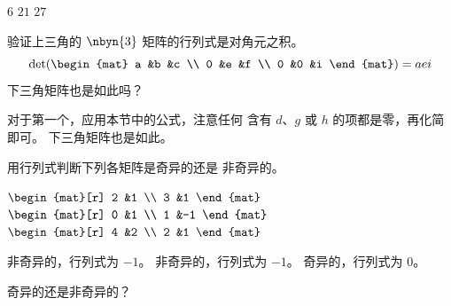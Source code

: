\begin{exercises}
    \begin{answer}
      \begin{exparts*}
        \partsitem \( 6 \)
        \partsitem \( 21 \)
        \partsitem \( 27 \)
      \end{exparts*}  
    \end{answer}
  \recommended \item  
    验证上三角的
    $\nbyn{3}$ 矩阵的行列式是对角元之积。
    \begin{equation*}
       \det(
       \begin{mat}
           a    &b   &c    \\
           0    &e   &f    \\
           0    &0   &i
       \end{mat}
       )
       =aei
    \end{equation*}
    下三角矩阵也是如此吗？
    \begin{answer}
      对于第一个，应用本节中的公式，注意任何
      含有 \( d \)、\( g \) 或 \( h \) 的项都是零，再化简即可。
      下三角矩阵也是如此。  
    \end{answer}
  \recommended \item 
     用行列式判断下列各矩阵是奇异的还是
     非奇异的。
     \begin{exparts*}
       \partsitem \(
            \begin{mat}[r]
                2    &1   \\
                3    &1
            \end{mat}    \)
       \partsitem \(
            \begin{mat}[r]
                0    &1   \\
                1    &-1
            \end{mat}    \)
       \partsitem \(
            \begin{mat}[r]
                4    &2   \\
                2    &1
            \end{mat}    \)
     \end{exparts*}
     \begin{answer}
       \begin{exparts}
         \partsitem 非奇异的，行列式为 \( -1 \)。
         \partsitem 非奇异的，行列式为 \( -1 \)。
         \partsitem 奇异的，行列式为 \( 0 \)。
       \end{exparts}  
     \end{answer}
  \item 
     奇异的还是非奇异的？

\end{exercises}

